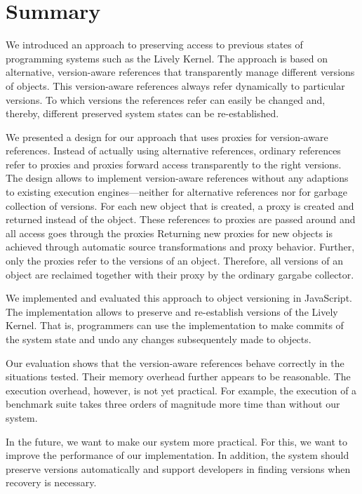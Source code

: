 \chapter{Summary} \label{chapter:SUMMARY}

We introduced an approach to preserving access to previous states of programming systems such as the Lively Kernel.
The approach is based on alternative, version-aware references that transparently manage different versions of objects.
This version-aware references always refer dynamically to particular versions.
To which versions the references refer can easily be changed and, thereby, different preserved system states can be re-established.

We presented a design for our approach that uses proxies for version-aware references.
Instead of actually using alternative references, ordinary references refer to proxies and proxies forward access transparently to the right versions.
The design allows to implement version-aware references without any adaptions to existing execution engines---neither for alternative references nor for garbage collection of versions.
For each new object that is created, a proxy is created and returned instead of the object.
These references to proxies are passed around and all access goes through the proxies
Returning new proxies for new objects is achieved through automatic source transformations and proxy behavior.
Further, only the proxies refer to the versions of an object.
Therefore, all versions of an object are reclaimed together with their proxy by the ordinary gargabe collector.

We implemented and evaluated this approach to object versioning in JavaScript.
The implementation allows to preserve and re-establish versions of the Lively Kernel.
That is, programmers can use the implementation to make commits of the system state and undo any changes subsequentely made to objects.

Our evaluation shows that the version-aware references behave correctly in the situations tested.
Their memory overhead further appears to be reasonable.
The execution overhead, however, is not yet practical.
For example, the execution of a benchmark suite takes three orders of magnitude more time than without our system.

In the future, we want to make our system more practical.
For this, we want to improve the performance of our implementation.
In addition, the system should preserve versions automatically and support developers in finding versions when recovery is necessary.

